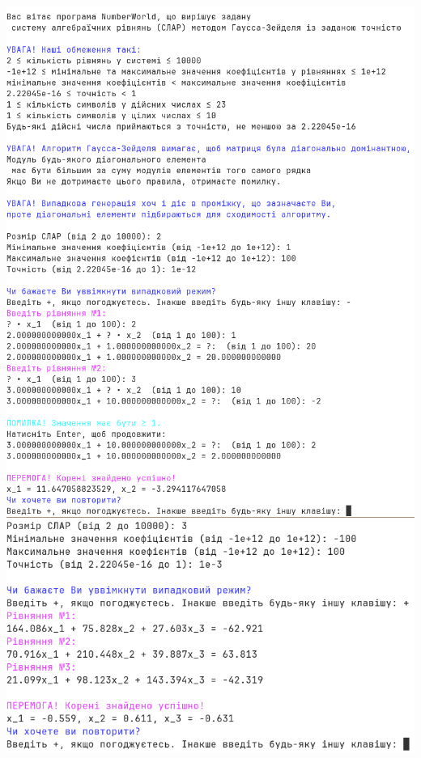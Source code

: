 \documentclass[a4paper,12pt]{extarticle}
\begin{document}
\includegraphics[height=\textheight]{examples/example1.png}\\
\includegraphics[width=\textwidth]{examples/example2.png}\\
\end{document}
